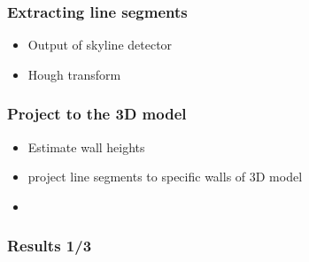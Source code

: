 \documentclass{beamer}
\begin{document}
\frame
{
	\frametitle{Extracting line segments}
	\begin{itemize}
	\item <+-| alert@+> Output of skyline detector
	\item <+-| alert@+> Hough transform
	\end{itemize}


}


\frame
{
	\frametitle{Project to the 3D model}
	\begin{itemize}
	\item <+-| alert@+> Estimate wall heights 
	\item <+-| alert@+> project line segments to specific walls of 3D model
	\item <+-| alert@+> 
	\end{itemize}
}


\frame
{
	\frametitle{Results 1/3}
}
\end{document}

